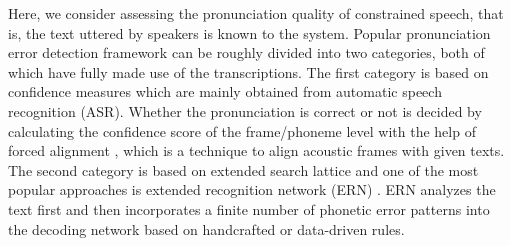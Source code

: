 \documentclass[a4paper]{article}
\begin{document}
Here, we consider assessing the pronunciation quality of constrained speech, that is, the text uttered by speakers is known to the system. Popular pronunciation error detection framework can be roughly divided into two categories, both of which have fully made use of the transcriptions. The first category is based on confidence measures which are mainly obtained from automatic speech recognition (ASR). Whether the pronunciation is correct or not is decided by calculating the confidence score of the frame/phoneme level with the help of forced alignment \cite{witt2000phone,hu2013new,zheng2007generalized}, which is a technique to align acoustic frames with given texts. The second category is based on extended search lattice and one of the most popular approaches is extended recognition network (ERN) \cite{harrison2009implementation}. ERN analyzes the text first and then incorporates a finite number of phonetic error patterns into the decoding network based on handcrafted or data-driven rules. 
\end{document}

